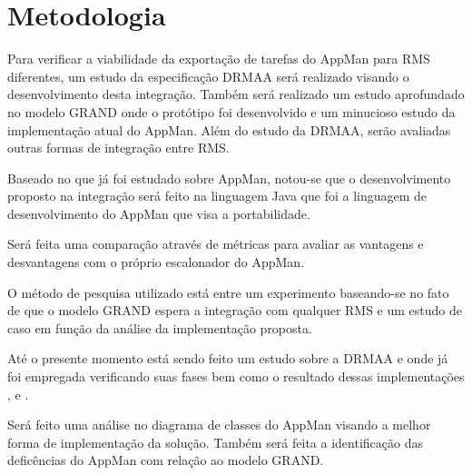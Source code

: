 \section{Metodologia}
\label{cap:metodologia}

Para verificar a viabilidade da exportação de tarefas do AppMan para RMS diferentes, um estudo da especificação DRMAA será realizado visando o desenvolvimento desta integração. Também será realizado um estudo aprofundado no modelo GRAND onde o protótipo foi desenvolvido e um minucioso estudo da implementação atual do AppMan. Além do estudo da DRMAA, serão avaliadas outras formas de integração entre RMS.

Baseado no que já foi estudado sobre AppMan, notou-se que o desenvolvimento proposto na integração será feito na linguagem Java que foi a linguagem de desenvolvimento do AppMan que visa a portabilidade. 

Será feita uma comparação através de métricas para avaliar as vantagens e desvantagens com o próprio escalonador do AppMan. 

O método de pesquisa utilizado está entre um experimento baseando-se no fato de que o modelo GRAND espera a integração com qualquer RMS e um estudo de caso em função da análise da implementação proposta.

Até o presente momento está sendo feito um estudo sobre a DRMAA e onde já foi empregada verificando suas fases bem como o resultado dessas implementações \cite{Templeton}, \cite{Llorente2005} e \cite{Haas2004}.

Será feito uma análise no diagrama de classes do AppMan visando a melhor forma de implementação da solução. Também será feita a identificação das deficências do AppMan com relação ao modelo GRAND.
